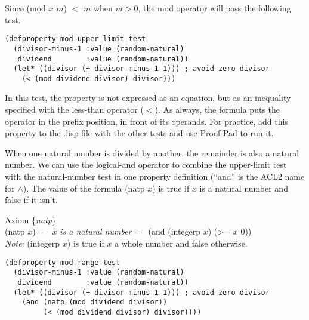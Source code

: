 Since (\textsf{mod} $x$ $m$) $<$ $m$ when $m > 0$, 
the \textsf{mod} operator will pass the following test.

\begin{Verbatim}
(defproperty mod-upper-limit-test
  (divisor-minus-1 :value (random-natural)
   dividend        :value (random-natural))
  (let* ((divisor (+ divisor-minus-1 1))) ; avoid zero divisor
    (< (mod dividend divisor) divisor)))
\end{Verbatim}

In this test, the property is not expressed as an equation,
but as an inequality
specified with the less-than operator ($<$).
As always, the formula puts the operator in the prefix position,
in front of its operands.
For practice, add this property to the .lisp file with the other tests and
use Proof Pad to run it.

When one natural number is divided by another,
the remainder is also a natural number.
We can use the logical-and operator
to combine the upper-limit test with the natural-number test
in one property definition
(``\textsf{and}'' is the ACL2 name for $\wedge$).
\label{natp-op}The value of the formula
\textsf{(natp $x$)} is true
if $x$ is a natural number and false if it isn't.

\label{natp-axiom-formal}
\begin{center}
Axiom \{\emph{natp}\} \\
(natp $x$) $=$ $x$ \emph{is a natural number} $=$ \textsf{(and (integerp $x$) (>= $x$ 0))}\\
\emph{Note}: \textsf{(integerp $x$)} is true if $x$ a whole number and false otherwise.
\end{center}

\begin{Verbatim}
(defproperty mod-range-test
  (divisor-minus-1 :value (random-natural)
   dividend        :value (random-natural))
  (let* ((divisor (+ divisor-minus-1 1))) ; avoid zero divisor
    (and (natp (mod dividend divisor))
         (< (mod dividend divisor) divisor))))
\end{Verbatim}

